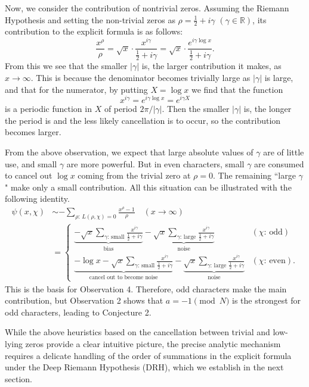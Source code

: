 \documentclass[12pt,reqno]{amsart}
\theoremstyle{definition}
\theoremstyle{remark}
\numberwithin{equation}{section}
\begin{document}
Now, we consider the contribution of nontrivial zeros. 
Assuming the Riemann Hypothesis and setting the non-trivial zeros as $\rho=\frac12+i\gamma$ $(\gamma\in\mathbb R)$, 
its contribution to the explicit formula is as follows:
\[
\frac{x^\rho}{\rho}
=\sqrt x\cdot \frac{x^{i\gamma}}{\frac12+i\gamma}
=\sqrt x\cdot \frac{e^{i\gamma\log x}}{\frac12+i\gamma}.
\]
From this we see that the smaller $|\gamma|$ is, the larger contribution it makes,  as $x\to\infty$.
This is because the denominator becomes trivially large as $|\gamma|$ is large, 
and that for the numerator, by putting $X=\log x$ we find that the function
\[
x^{i\gamma}=e^{i\gamma\log x}=e^{i\gamma X}
\]
is a periodic function in $X$ of period $2\pi/|\gamma|$.
Then the smaller $|\gamma|$ is, the longer the period is and the less likely cancellation is to occur,
so the contribution becomes larger.

From the above observation, 
we expect that large absolute values of $\gamma$ are of little use, and small $\gamma$ are more powerful.
But in even characters, small $\gamma$ are consumed to cancel out $\log x$ coming from the trivial zero at $\rho=0$. 
The remaining ``large $\gamma$" make only a small contribution. 
All this situation can be illustrated with the following identity.
\begin{align*}
\psi(x,\chi)
&\sim -\sum_{\rho:\,L(\rho,\chi)=0}\frac{x^\rho-1}\rho\quad (x\to\infty)\\
&=\begin{cases}
\displaystyle
\underbrace{-\sqrt x \sum_{\gamma:\,\text{small}}\frac{x^{i\gamma}}{\frac12+i\gamma}}_{\text{bias}}
-\underbrace{\sqrt x \sum_{\gamma:\,\text{large}}\frac{x^{i\gamma}}{\frac12+i\gamma}}_{\text{noise}} & (\chi:\,\text{odd})\\
\displaystyle\underbrace{-\log x-\sqrt x \sum_{\gamma:\,\text{small}}\frac{x^{i\gamma}}{\frac12+i\gamma}}_{\text{cancel out to become noise}}
-\underbrace{\sqrt x \sum_{\gamma:\,\text{large}}\frac{x^{i\gamma}}{\frac12+i\gamma}}_{\text{noise}}
& (\chi:\,\text{even}).
\end{cases}
\end{align*}
This is the basis for Observation 4. 
Therefore, odd characters make the main contribution, 
but Observation 2 shows that $a=-1\pmod N$ is the strongest for odd characters, leading to Conjecture 2.

While the above heuristics based on the cancellation between trivial and low-lying zeros provide a clear intuitive picture, the precise analytic mechanism requires a delicate handling of the order of summations in the explicit formula under the Deep Riemann Hypothesis (DRH), which we establish in the next section.
\end{document}
